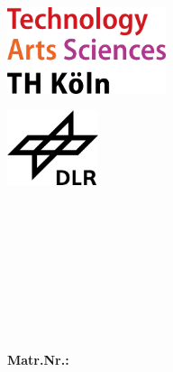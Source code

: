 

\begin{titlepage}
	\begin{minipage}[][][c]{0.48\textwidth}
		\flushleft
		\includegraphics[width=0.35\textwidth]{fig/ch00_TH_Koeln_Logo.pdf}
	\end{minipage}
	\begin{minipage}[][][c]{0.48\textwidth}
		\flushright
		\includegraphics[width=0.2\textwidth]{fig/ch00_DLR_Logo_1.png}
	\end{minipage}

	\begin{minipage}[][][c]{0.48\textwidth}
		\begin{flushleft}
			\textsf{\small\\ [0.35cm]
		\workInstitution\\ [0.4cm]
		\workFakultaet}
		\end{flushleft}
	\end{minipage}
	\begin{minipage}[][][c]{0.48\textwidth}
		\begin{flushright}
			\textsf{\small
		\workCompany\\ [0.4cm]
		\workInstitut\\ [0.1cm]
		}
		\end{flushright}
	\end{minipage}
	
	\thispagestyle{empty}
	
	\vspace{3cm}
	
	\begin{center}
		\textsf{\textbf{\large{\workTyp}}}\\
		\vspace{1.5cm}
			\textsf{\textbf{\Huge{\workTitel}}}\\
		\vspace{3cm}
			\textsf{\textbf{\large{\workAutor}}}\\
			\textsf{\textbf{\large{Matr.Nr.: \workMatrikelnummer}}}\\
		\vspace{0,5cm}
			\textsf{\normalsize{\workStadtDatum}}
		\vspace{1.5cm}
	\end{center}
	

\end{titlepage}
